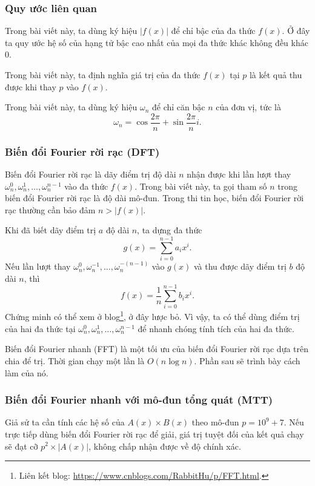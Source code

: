 \documentclass[11pt]{article}
\begin{document}
\subsubsection{Quy ước liên quan}

Trong bài viết này, ta dùng ký hiệu \(|f(x)|\) để chỉ bậc của đa thức \(f(x)\).
Ở đây ta quy ước hệ số của hạng tử bậc cao nhất của mọi đa thức khác không đều
khác \(0\).

Trong bài viết này, ta định nghĩa giá trị của đa thức \(f(x)\) tại \(p\) là kết
quả thu được khi thay \(p\) vào \(f(x)\).

Trong bài viết này, ta dùng ký hiệu \(\omega_n\) để chỉ căn bậc \(n\) của đơn
vị, tức là
\[
\omega_n=\cos\frac{2\pi}{n}+\sin\frac{2\pi}{n}i.
\]

\subsubsection{Biến đổi Fourier rời rạc (DFT)}

Biến đổi Fourier rời rạc là dãy điểm trị độ dài \(n\) nhận được khi lần lượt
thay \(\omega_n^0,\omega_n^1,\ldots,\omega_n^{n-1}\) vào đa thức \(f(x)\).
Trong bài viết này, ta gọi tham số \(n\) trong biến đổi Fourier rời rạc là độ
dài mô-đun. Trong thi tin học, biến đổi Fourier rời rạc thường cần bảo đảm
\(n>|f(x)|\).

Khi đã biết dãy điểm trị \(a\) độ dài \(n\), ta dựng đa thức
\[
g(x)=\sum_{i=0}^{n-1}a_i x^i.
\]
Nếu lần lượt thay
\(\omega_n^0,\omega_n^{-1},\ldots,\omega_n^{-(n-1)}\) vào \(g(x)\) và thu được
dãy điểm trị \(b\) độ dài \(n\), thì
\[
f(x)=\frac1n\sum_{i=0}^{n-1}b_i x^i.
\]
Chứng minh có thể xem ở blog\footnote{Liên kết blog:
\url{https://www.cnblogs.com/RabbitHu/p/FFT.html}.}, ở đây lược bỏ. Vì vậy, ta
có thể dùng điểm trị của hai đa thức tại
\(\omega_n^0,\omega_n^1,\ldots,\omega_n^{n-1}\) để nhanh chóng tính tích của
hai đa thức.

Biến đổi Fourier nhanh (FFT) là một tối ưu của biến đổi Fourier rời rạc dựa
trên chia để trị. Thời gian chạy một lần là \(O(n\log n)\). Phần sau sẽ trình
bày cách làm của nó.

\subsubsection{Biến đổi Fourier nhanh với mô-đun tổng quát (MTT)}

Giả sử ta cần tính các hệ số của \(A(x)\times B(x)\) theo mô-đun
\(p=10^9+7\). Nếu trực tiếp dùng biến đổi Fourier rời rạc để giải, giá trị tuyệt
đối của kết quả chạy sẽ đạt cỡ \(p^2\times |A(x)|\), không chấp nhận được về độ
chính xác.
\end{document}
